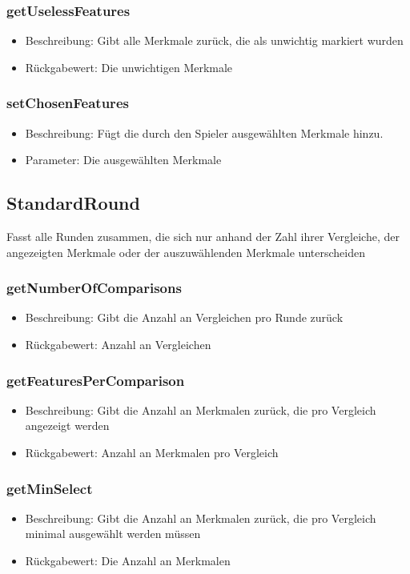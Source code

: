 \documentclass[a4paper]{scrreprt}
\begin{document}
	\subsubsection{getUselessFeatures}
	\begin{itemize}
		\item Beschreibung: Gibt alle Merkmale zurück, die als unwichtig markiert wurden
		\item Rückgabewert: Die unwichtigen Merkmale
	\end{itemize}
	\subsubsection{setChosenFeatures}
	\begin{itemize}
		\item Beschreibung: Fügt die durch den Spieler ausgewählten Merkmale hinzu.
		\item Parameter: Die ausgewählten Merkmale
	\end{itemize}
	
	\subsection{StandardRound}
	Fasst alle Runden zusammen, die sich nur anhand der Zahl ihrer Vergleiche, der angezeigten Merkmale oder der auszuwählenden Merkmale unterscheiden
	\subsubsection{getNumberOfComparisons}
	\begin{itemize}
		\item Beschreibung: Gibt die Anzahl an Vergleichen pro Runde zurück
		\item Rückgabewert: Anzahl an Vergleichen
	\end{itemize}
	\subsubsection{getFeaturesPerComparison}
	\begin{itemize}
		\item Beschreibung: Gibt die Anzahl an Merkmalen zurück, die pro Vergleich angezeigt werden
		\item Rückgabewert: Anzahl an Merkmalen pro Vergleich
	\end{itemize}
	\subsubsection{getMinSelect}
	\begin{itemize}
		\item Beschreibung: Gibt die Anzahl an Merkmalen zurück, die pro Vergleich minimal ausgewählt werden müssen
		\item Rückgabewert: Die Anzahl an Merkmalen
	\end{itemize}
\end{document}
